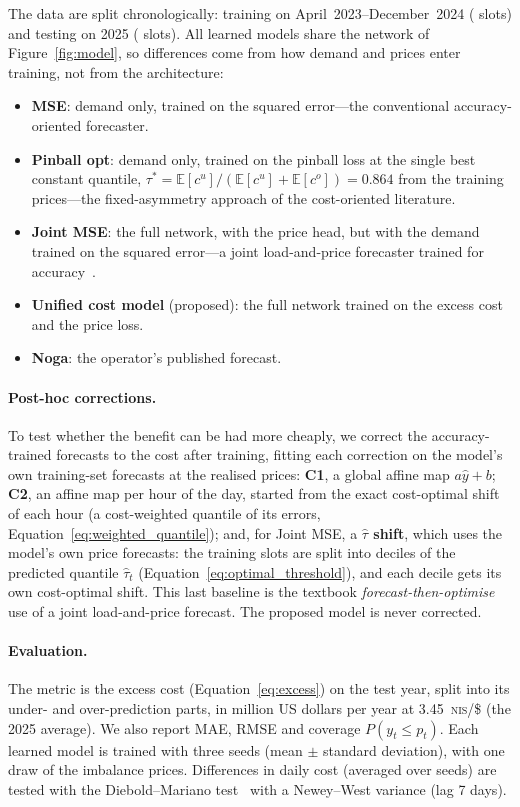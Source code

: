 The data are split chronologically: training on April~2023--December~2024
(\nTrain{} slots) and testing on 2025 (\nTest{} slots).  All learned models
share the network of Figure~\ref{fig:model}, so differences come from how
demand and prices enter training, not from the architecture:

\begin{itemize}
    \item \textbf{MSE}: demand only, trained on the squared error---the
          conventional accuracy-oriented forecaster.
    \item \textbf{Pinball opt}: demand only, trained on the pinball loss at
          the single best constant quantile,
          $\tau^*=\mathbb{E}[c^u]/(\mathbb{E}[c^u]+\mathbb{E}[c^o])=0.864$
          from the training prices---the fixed-asymmetry approach of the
          cost-oriented literature.
    \item \textbf{Joint MSE}: the full network, with the price head, but with
          the demand trained on the squared error---a joint load-and-price
          forecaster trained for accuracy~\parencite{shayeghi2015simultaneous,
          li2024joint}.
    \item \textbf{Unified cost model} (proposed): the full network trained on
          the excess cost and the price loss.
    \item \textbf{Noga}: the operator's published forecast.
\end{itemize}

\paragraph*{Post-hoc corrections.}  To test whether the benefit can be had
more cheaply, we correct the accuracy-trained forecasts to the cost after
training, fitting each correction on the model's own training-set forecasts
at the realised prices: \textbf{C1}, a global affine map $a\hat y+b$;
\textbf{C2}, an affine map per hour of the day, started from the exact
cost-optimal shift of each hour (a cost-weighted quantile of its errors,
Equation~\eqref{eq:weighted_quantile}); and, for Joint MSE, a
\textbf{$\hat\tau$ shift}, which uses the model's own price forecasts: the
training slots are split into deciles of the predicted quantile
$\hat\tau_t$ (Equation~\eqref{eq:optimal_threshold}), and each decile gets its
own cost-optimal shift.  This last baseline is the textbook
\emph{forecast-then-optimise} use of a joint load-and-price forecast.  The
proposed model is never corrected.

\paragraph*{Evaluation.}  The metric is the excess cost
(Equation~\eqref{eq:excess}) on the test year, split into its under- and
over-prediction parts, in million US dollars per year at
3.45~\textsc{nis}/\$ (the 2025 average).  We also report MAE, RMSE and
coverage $P(y_t\le p_t)$.  Each learned model is trained with three seeds
(mean $\pm$ standard deviation), with one draw of the imbalance prices.
Differences in daily cost (averaged over seeds) are tested with the
Diebold--Mariano test~\parencite{diebold1995comparing} with a Newey--West
variance (lag 7 days).
